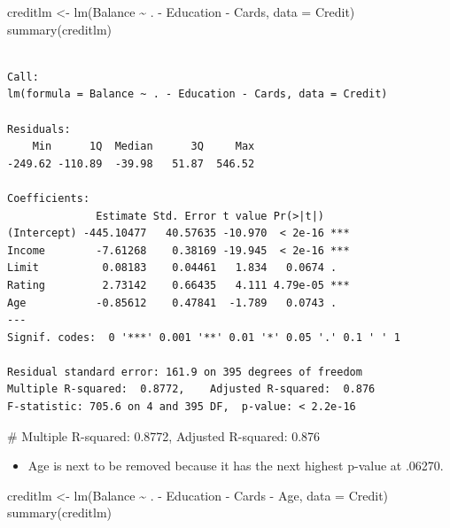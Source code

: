 \documentclass[
  letterpaper,
  DIV=11,
  numbers=noendperiod]{scrreprt}
\newenvironment{Shaded}{\begin{snugshade}}{\end{snugshade}}
\newcommand{\AttributeTok}[1]{\textcolor[rgb]{0.40,0.45,0.13}{#1}}
\newcommand{\CommentTok}[1]{\textcolor[rgb]{0.37,0.37,0.37}{#1}}
\newcommand{\FunctionTok}[1]{\textcolor[rgb]{0.28,0.35,0.67}{#1}}
\newcommand{\NormalTok}[1]{\textcolor[rgb]{0.00,0.23,0.31}{#1}}
\newcommand{\OtherTok}[1]{\textcolor[rgb]{0.00,0.23,0.31}{#1}}
\newcommand{\SpecialCharTok}[1]{\textcolor[rgb]{0.37,0.37,0.37}{#1}}
\providecommand{\tightlist}{%
  \setlength{\itemsep}{0pt}\setlength{\parskip}{0pt}}\usepackage{longtable,booktabs,array}
\begin{document}
\begin{Shaded}
\begin{Highlighting}[]
\NormalTok{creditlm }\OtherTok{\textless{}{-}} \FunctionTok{lm}\NormalTok{(Balance }\SpecialCharTok{\textasciitilde{}}\NormalTok{ . }\SpecialCharTok{{-}}\NormalTok{ Education }\SpecialCharTok{{-}}\NormalTok{ Cards, }\AttributeTok{data =}\NormalTok{ Credit)}
\FunctionTok{summary}\NormalTok{(creditlm)}
\end{Highlighting}
\end{Shaded}

\begin{verbatim}

Call:
lm(formula = Balance ~ . - Education - Cards, data = Credit)

Residuals:
    Min      1Q  Median      3Q     Max 
-249.62 -110.89  -39.98   51.87  546.52 

Coefficients:
              Estimate Std. Error t value Pr(>|t|)    
(Intercept) -445.10477   40.57635 -10.970  < 2e-16 ***
Income        -7.61268    0.38169 -19.945  < 2e-16 ***
Limit          0.08183    0.04461   1.834   0.0674 .  
Rating         2.73142    0.66435   4.111 4.79e-05 ***
Age           -0.85612    0.47841  -1.789   0.0743 .  
---
Signif. codes:  0 '***' 0.001 '**' 0.01 '*' 0.05 '.' 0.1 ' ' 1

Residual standard error: 161.9 on 395 degrees of freedom
Multiple R-squared:  0.8772,    Adjusted R-squared:  0.876 
F-statistic: 705.6 on 4 and 395 DF,  p-value: < 2.2e-16
\end{verbatim}

\begin{Shaded}
\begin{Highlighting}[]
\CommentTok{\# Multiple R{-}squared: 0.8772, Adjusted R{-}squared: 0.876}
\end{Highlighting}
\end{Shaded}

\begin{itemize}
\tightlist
\item
  Age is next to be removed because it has the next highest p-value at
  .06270.
\end{itemize}

\begin{Shaded}
\begin{Highlighting}[]
\NormalTok{creditlm }\OtherTok{\textless{}{-}} \FunctionTok{lm}\NormalTok{(Balance }\SpecialCharTok{\textasciitilde{}}\NormalTok{ . }\SpecialCharTok{{-}}\NormalTok{ Education }\SpecialCharTok{{-}}\NormalTok{ Cards }\SpecialCharTok{{-}}\NormalTok{ Age, }\AttributeTok{data =}\NormalTok{ Credit)}
\FunctionTok{summary}\NormalTok{(creditlm)}
\end{Highlighting}
\end{Shaded}
\end{document}
